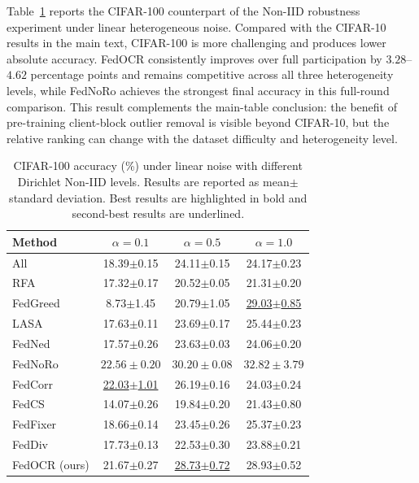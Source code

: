 Table~\ref{tab:cifar100_noniid_appendix} reports the CIFAR-100 counterpart of the Non-IID robustness experiment under linear heterogeneous noise.
Compared with the CIFAR-10 results in the main text, CIFAR-100 is more challenging and produces lower absolute accuracy.
FedOCR consistently improves over full participation by $3.28$--$4.62$ percentage points and remains competitive across all three heterogeneity levels, while FedNoRo achieves the strongest final accuracy in this full-round comparison.
This result complements the main-table conclusion: the benefit of pre-training client-block outlier removal is visible beyond CIFAR-10, but the relative ranking can change with the dataset difficulty and heterogeneity level.

\begin{table}[h]
\centering
\caption{\normalfont CIFAR-100 accuracy (\%) under linear noise with different Dirichlet Non-IID levels. Results are reported as mean$\pm$standard deviation. Best results are highlighted in bold and second-best results are underlined.}
\label{tab:cifar100_noniid_appendix}
\setlength{\tabcolsep}{4pt}
\renewcommand{\arraystretch}{1.12}
\begin{tabular}{lccc}
\toprule
\textbf{Method} & $\alpha=0.1$ & $\alpha=0.5$ & $\alpha=1.0$ \\
\midrule
All & 18.39$\pm$0.15 & 24.11$\pm$0.15 & 24.17$\pm$0.23 \\
RFA~\cite{pillutla2022robust} & 17.32$\pm$0.17 & 20.52$\pm$0.05 & 21.31$\pm$0.20 \\
FedGreed~\cite{kritharakis2025fedgreed} & 8.73$\pm$1.45 & 20.79$\pm$1.05 & \underline{29.03$\pm$0.85} \\
LASA~\cite{xu2025lasa} & 17.63$\pm$0.11 & 23.69$\pm$0.17 & 25.44$\pm$0.23 \\
FedNed~\cite{lu2024fedned} & 17.57$\pm$0.26 & 23.63$\pm$0.03 & 24.06$\pm$0.20 \\
FedNoRo~\cite{wu2023fednoro} & $\boldsymbol{22.56\pm0.20}$ & $\boldsymbol{30.20\pm0.08}$ & $\boldsymbol{32.82\pm3.79}$ \\
FedCorr~\cite{xu2022fedcorr} & \underline{22.03$\pm$1.01} & 26.19$\pm$0.16 & 24.03$\pm$0.24 \\
FedCS~\cite{hao2025fedcs} & 14.07$\pm$0.26 & 19.84$\pm$0.20 & 21.43$\pm$0.80 \\
FedFixer~\cite{ji2024fedfixer} & 18.66$\pm$0.14 & 23.45$\pm$0.26 & 25.37$\pm$0.23 \\
FedDiv~\cite{li2024feddiv} & 17.73$\pm$0.13 & 22.53$\pm$0.30 & 23.88$\pm$0.21 \\
\midrule
FedOCR (ours) & 21.67$\pm$0.27 & \underline{28.73$\pm$0.72} & 28.93$\pm$0.52 \\
\bottomrule
\end{tabular}
\end{table}
